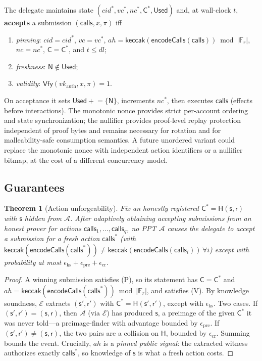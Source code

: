 \documentclass[11pt]{article}
\theoremstyle{definition}
\theoremstyle{plain}
\newtheorem{theorem}{Theorem}
\newcommand{\Hash}{\mathsf{H}}       %
\newcommand{\keccak}{\mathsf{keccak}}
\newcommand{\Fr}{\mathbb{F}_r}       %
\newcommand{\secret}{\mathsf{s}}
\newcommand{\salt}{\mathsf{r}}
\newcommand{\commit}{\mathsf{C}}
\newcommand{\nul}{\mathsf{N}}
\begin{document}
The delegate maintains state $(\mathit{cid}^*,\mathit{vc}^*,\mathit{nc}^*,\commit^*,
\mathsf{Used})$ and, at wall-clock $t$, \textbf{accepts} a submission
$(\mathsf{calls},x,\pi)$ iff
\begin{enumerate}\itemsep2pt
\item[\textbf{(P)}] \emph{pinning}: $\mathit{cid}=\mathit{cid}^*$, $\mathit{vc}=\mathit{vc}^*$,
$\mathit{ah}=\keccak(\mathsf{encodeCalls}(\mathsf{calls})) \bmod |\Fr|$, $\mathit{nc}=\mathit{nc}^*$,
$\commit=\commit^*$, and $t\le \mathit{dl}$;
\item[\textbf{(U)}] \emph{freshness}: $\nul\notin\mathsf{Used}$;
\item[\textbf{(V)}] \emph{validity}: $\mathsf{Vfy}(vk_{\mathrm{auth}},x,\pi)=1$.
\end{enumerate}
On acceptance it sets $\mathsf{Used}\mathrel{+}=\{\nul\}$, increments
$\mathit{nc}^*$, then executes $\mathsf{calls}$ (effects before interactions).
The monotonic nonce provides strict per-account ordering and state synchronization;
the nullifier provides proof-level replay protection independent of proof bytes and
remains necessary for rotation and for malleability-safe consumption semantics. A
future unordered variant could replace the monotonic nonce with independent action
identifiers or a nullifier bitmap, at the cost of a different concurrency model.

\subsection{Guarantees}

\begin{theorem}[Action unforgeability]
\label{thm:unforge}
Fix an honestly registered $\commit^*=\Hash(\secret,\salt)$ with $\secret$ hidden from
$\mathcal{A}$. After adaptively obtaining accepting submissions from an honest
prover for actions $\mathsf{calls}_1,\dots,\mathsf{calls}_q$, no PPT $\mathcal{A}$ causes the delegate to
accept a submission for a \emph{fresh} action $\mathsf{calls}^*$ (with
$\keccak(\mathsf{encodeCalls}(\mathsf{calls}^*))\neq
\keccak(\mathsf{encodeCalls}(\mathsf{calls}_i))\,\forall i$) except with
probability at most $\epsilon_{\mathrm{ks}}+\epsilon_{\mathrm{pre}}+\epsilon_{\mathrm{cr}}$.
\end{theorem}
\begin{proof}
A winning submission satisfies (P), so its statement has $\commit=\commit^*$ and
$\mathit{ah}=\keccak(\mathsf{encodeCalls}(\mathsf{calls}^*)) \bmod |\Fr|$, and satisfies (V). By knowledge soundness,
$\mathcal{E}$ extracts $(\secret',\salt')$ with $\commit^*=\Hash(\secret',\salt')$,
except with $\epsilon_{\mathrm{ks}}$. Two cases. If $(\secret',\salt')=(\secret,\salt)$,
then $\mathcal{A}$ (via $\mathcal{E}$) has produced $\secret$, a preimage of the given
$\commit^*$ it was never told---a preimage-finder with advantage bounded by
$\epsilon_{\mathrm{pre}}$. If $(\secret',\salt')\neq(\secret,\salt)$, the two pairs are
a collision on $\Hash$, bounded by $\epsilon_{\mathrm{cr}}$. Summing bounds the event.
Crucially, $\mathit{ah}$ is a \emph{pinned public signal}: the extracted witness
authorizes exactly $\mathsf{calls}^*$, so knowledge of $\secret$ is what a fresh
action costs.
\end{proof}
\end{document}
